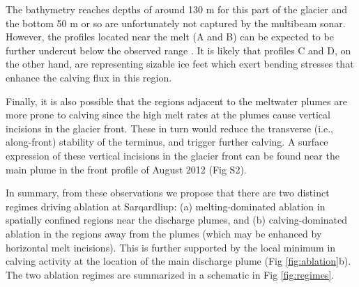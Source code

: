 \documentclass[10pt,letterpaper]{article}
\begin{document}
The bathymetry reaches depths of around 130 m for this part of the glacier and the bottom 50 m or so are unfortunately not captured by the multibeam sonar. However, the profiles located near the melt (A and B) can be expected to be further undercut below the observed range \citep{Fried:2015bc}. It is likely that profiles C and D, on the other hand, are representing sizable ice feet which exert bending stresses that enhance the calving flux in this region. 

Finally, it is also possible that the regions adjacent to the meltwater plumes are more prone to calving since the high melt rates at the plumes cause vertical incisions in the glacier front. These in turn would reduce the transverse (i.e., along-front) stability of the terminus, and trigger further calving. A surface expression of these vertical incisions in the glacier front can be found near the main plume in the front profile of August 2012 (Fig S2).

In summary, from these observations we propose that there are two distinct regimes driving ablation at Sarqardliup: (a) melting-dominated ablation in spatially confined regions near the discharge plumes, and (b) calving-dominated ablation in the regions away from the plumes (which may be enhanced by horizontal melt incisions). This is further supported by the local minimum in calving activity at the location of the main discharge plume (Fig \ref{fig:ablation}b). The two ablation regimes are summarized in a schematic in Fig \ref{fig:regimes}.

\end{document}
